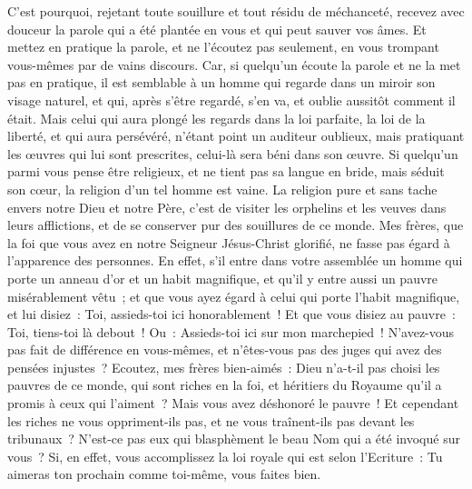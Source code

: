 \begin{multicols}{2}
C'est pourquoi, rejetant toute souillure et tout résidu de méchanceté, recevez avec douceur la parole qui a été plantée en vous et qui peut sauver vos âmes.
Et mettez en pratique la parole, et ne l'écoutez pas seulement, en vous trompant vous-mêmes par de vains discours.
Car, si quelqu'un écoute la parole et ne la met pas en pratique, il est semblable à un homme qui regarde dans un miroir son visage naturel,
et qui, après s'être regardé, s'en va, et oublie aussitôt comment il était.
Mais celui qui aura plongé les regards dans la loi parfaite, la loi de la liberté, et qui aura persévéré, n'étant point un auditeur oublieux, mais pratiquant les œuvres qui lui sont prescrites, celui-là sera béni dans son œuvre.
Si quelqu'un parmi vous pense être religieux, et ne tient pas sa langue en bride, mais séduit son cœur, la religion d'un tel homme est vaine.
La religion pure et sans tache envers notre Dieu et notre Père, c'est de visiter les orphelins et les veuves dans leurs afflictions, et de se conserver pur des souillures de ce monde.
\VerseOne{}Mes frères, que la foi que vous avez en notre Seigneur Jésus-Christ glorifié, ne fasse pas égard à l'apparence des personnes.
En effet, s'il entre dans votre assemblée un homme qui porte un anneau d'or et un habit magnifique, et qu'il y entre aussi un pauvre misérablement vêtu~;
et que vous ayez égard à celui qui porte l'habit magnifique, et lui disiez~: Toi, assieds-toi ici honorablement~! Et que vous disiez au pauvre~: Toi, tiens-toi là debout~! Ou~: Assieds-toi ici sur mon marchepied~!
N'avez-vous pas fait de différence en vous-mêmes, et n'êtes-vous pas des juges qui avez des pensées injustes~?
Ecoutez, mes frères bien-aimés~: Dieu n'a-t-il pas choisi les pauvres de ce monde, qui sont riches en la foi, et héritiers du Royaume qu'il a promis à ceux qui l'aiment~?
Mais vous avez déshonoré le pauvre~! Et cependant les riches ne vous oppriment-ils pas, et ne vous traînent-ils pas devant les tribunaux~?
N'est-ce pas eux qui blasphèment le beau Nom qui a été invoqué sur vous~?
Si, en effet, vous accomplissez la loi royale qui est selon l'Ecriture~: Tu aimeras ton prochain comme toi-même, vous faites bien.

\end{multicols}
